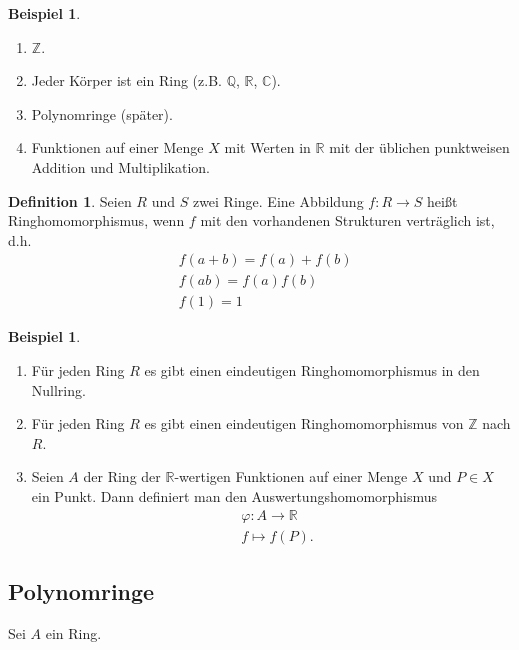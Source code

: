 \documentclass[reqno,12pt]{article}
\numberwithin{equation}{section}
\newcommand{\bC}{\mathbb{C}}
\newcommand{\bQ}{\mathbb{Q}}
\newcommand{\bR}{\mathbb{R}}
\newcommand{\bZ}{\mathbb{Z}}
\theoremstyle{plain}
\theoremstyle{definition}
\newtheorem{definition}[thm]{Definition}
\newtheorem{example}[thm]{Beispiel}
\begin{document}
\begin{example}
\
\begin{enumerate}
  \item $\bZ$.
  \item Jeder Körper ist ein Ring (z.B. $\bQ$, $\bR$, $\bC$).
  \item Polynomringe (später).
  \item Funktionen auf einer Menge $X$ mit Werten in $\bR$ mit der üblichen punktweisen Addition und Multiplikation.
\end{enumerate}
\end{example}

\begin{definition}
Seien $R$ und $S$ zwei Ringe. Eine Abbildung $ f \colon R \to S$ heißt {\sf Ringhomomorphismus}, wenn $f$ mit den vorhandenen Strukturen verträglich ist, d.h.
\begin{align*}
  & f(a+b)= f(a) + f(b) \\
  & f(ab) = f(a)f(b) \\
  & f(1) = 1
\end{align*}
\end{definition}



\begin{example}
\
\begin{enumerate}
\item Für jeden Ring $R$ es gibt einen eindeutigen Ringhomomorphismus in den Nullring.
\item Für jeden Ring $R$ es gibt einen eindeutigen Ringhomomorphismus von $\bZ$ nach $R$.
\item Seien $A$ der Ring der $\bR$-wertigen Funktionen auf einer Menge $X$ und $P\in X$ ein Punkt. Dann definiert man den Auswertungshomomorphismus
\begin{align*}
&   \varphi \colon A \to \bR \\
&   f \mapsto  f(P).
\end{align*}
\end{enumerate}
\end{example}




\subsection{Polynomringe}

Sei $A$ ein Ring.
\end{document}
